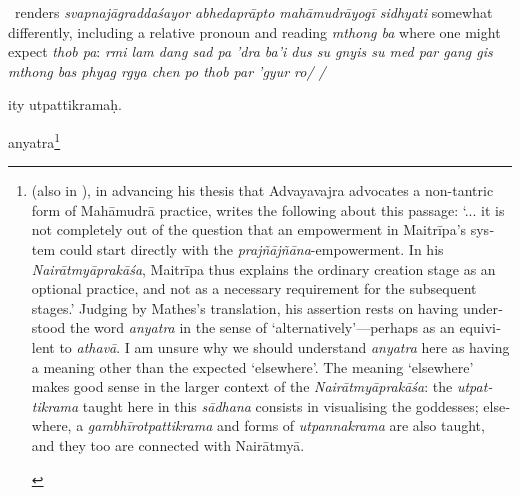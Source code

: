 \documentclass[naipra.tex]{subfiles}
\begin{document}
\begin{sanskrit}
{\begin{english}
		\TIB\ renders \emph{svapnajāgraddaśayor abhedaprāpto mahāmudrāyogī sidhyati} somewhat differently, including a relative pronoun and reading \emph{mthong ba} where one might expect \emph{thob pa}: \emph{rmi lam dang sad pa 'dra ba'i dus su gnyis su med par gang gis mthong bas phyag rgya chen po thob par 'gyur ro/ /} 
	\end{english}
}
ity utpattikramaḥ. 
\pend



\pstart
anyatra\footnote{
	\begin{english}%
		\textcite[374]{mathes2014} (also in \cite[132]{mathes2021}), in advancing his thesis that Advayavajra advocates a non-tantric form of Mahāmudrā practice, writes the following about this passage: `... it is not completely out of the question that an empowerment in Maitrīpa's system could start directly with the \emph{prajñājñāna}-empowerment. In his \emph{Nairātmyāprakāśa}, Maitrīpa thus explains the ordinary creation stage as an optional practice, and not as a necessary requirement for the subsequent stages.' 
		Judging by Mathes's translation, his assertion rests on having understood the word \emph{anyatra} in the sense of `alternatively'—perhaps as an equivilent to \emph{athavā}.
		I am unsure why we should understand \emph{anyatra} here as having a meaning other than the expected `elsewhere'.
		The meaning `elsewhere' makes good sense in the larger context of the \emph{Nairātmyāprakāśa}: the \emph{utpattikrama} taught here in this \emph{sādhana} consists in visualising the goddesses; elsewhere, a \emph{gambhīrotpattikrama} and forms of \emph{utpannakrama} are also taught, and they too are connected with Nairātmyā.


\end{english}}
\end{sanskrit}
\end{document}
